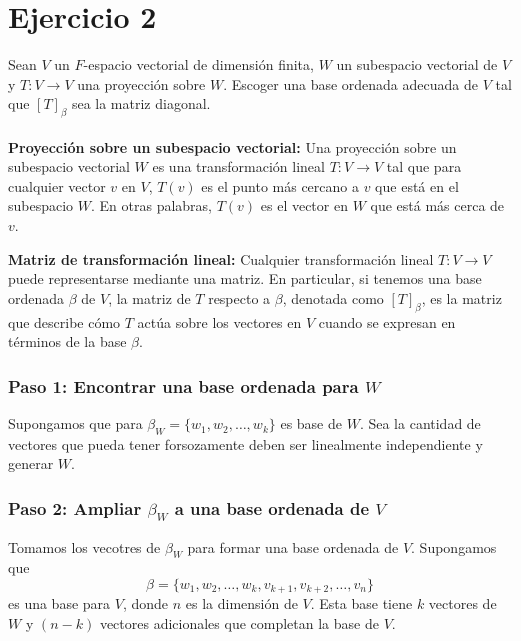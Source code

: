 \section*{Ejercicio 2}

Sean $V$ un $F$-espacio vectorial de dimensión finita, $W$ un subespacio vectorial de $V$ y $T: V \rightarrow V$
una proyección sobre $W$. Escoger una base ordenada adecuada de $V$ tal que $\left[ T \right]_{\beta}$
sea la matriz diagonal. \\

\noindent \solucion \\

\textbf{Proyección sobre un subespacio vectorial:} Una proyección sobre
un subespacio vectorial $W$ es una transformación lineal 
$T: V \rightarrow V$ tal que para cualquier vector $v$ en $V$,
$T(v)$ es el punto más cercano a $v$ que está en el subespacio $W$. 
En otras palabras, $T(v)$ es el vector en $W$ que está más cerca de $v$.

\textbf{Matriz de transformación lineal:} Cualquier transformación lineal
$T: V \rightarrow V$ puede representarse mediante una matriz.
En particular, si tenemos una base ordenada $\beta$ de $V$,
la matriz de $T$ respecto a $\beta$, denotada como $[T]_{\beta}$,
es la matriz que describe cómo $T$ actúa sobre los vectores en 
$V$ cuando se expresan en términos de la base $\beta$.

\subsubsection*{Paso 1: Encontrar una base ordenada para $W$}

Supongamos que para $\beta_W = \{w_1, w_2, \ldots, w_k\}$ es base de $W$. Sea la cantidad de vectores que pueda tener forsozamente deben ser linealmente independiente y generar $W$.

\subsubsection*{Paso 2: Ampliar $\beta_W$ a una base ordenada de $V$}

Tomamos los vecotres de $\beta_W$ para formar una base ordenada de $V$. Supongamos que 
\begin{equation*}
    \beta = \{w_1, w_2, \ldots, w_k, v_{k+1}, v_{k+2}, \ldots, v_n\}
\end{equation*}
es una base para $V$, donde $n$ es la dimensión de $V$. Esta base tiene $k$ vectores de $W$ y $(n - k)$ vectores adicionales que completan la base de $V$.


